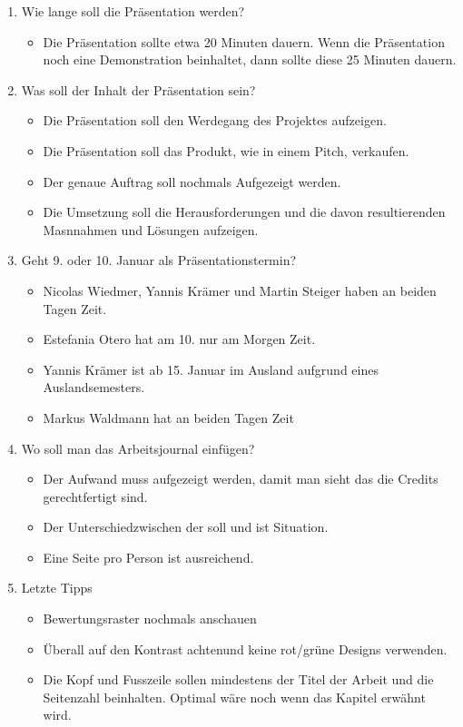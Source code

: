 \documentclass[a4paper, table]{article}
\begin{document}
\begin{enumerate}
    \item Wie lange soll die Präsentation werden?
        \begin{itemize}
            \item Die Präsentation sollte etwa 20 Minuten dauern. Wenn die Präsentation noch eine Demonstration beinhaltet, dann sollte diese 25 Minuten dauern.
        \end{itemize}
    \item Was soll der Inhalt der Präsentation sein?
        \begin{itemize}
            \item Die Präsentation soll den Werdegang des Projektes aufzeigen.
            \item Die Präsentation soll das Produkt, wie in einem Pitch, verkaufen.
            \item Der genaue Auftrag soll nochmals Aufgezeigt werden.
            \item Die Umsetzung soll die Herausforderungen und die davon resultierenden Masnnahmen und Lösungen aufzeigen.
        \end{itemize}
    \item Geht 9. oder 10. Januar als Präsentationstermin?
        \begin{itemize}
            \item Nicolas Wiedmer, Yannis Krämer und Martin Steiger haben an beiden Tagen Zeit.
            \item Estefania Otero hat am 10. nur am Morgen Zeit.
            \item Yannis Krämer ist ab 15. Januar im Ausland aufgrund eines Auslandsemesters.
            \item Markus Waldmann hat an beiden Tagen Zeit
        \end{itemize}
    \item Wo soll man das Arbeitsjournal einfügen?
        \begin{itemize}
            \item Der Aufwand muss aufgezeigt werden, damit man sieht das die Credits gerechtfertigt sind.
            \item Der Unterschiedzwischen der soll und ist Situation.
            \item Eine Seite pro Person ist ausreichend.
        \end{itemize}
    \item Letzte Tipps
        \begin{itemize}
            \item Bewertungsraster nochmals anschauen
            \item Überall auf den Kontrast achtenund keine rot/grüne Designs verwenden.
            \item Die Kopf und Fusszeile sollen mindestens der Titel der Arbeit und die Seitenzahl beinhalten. Optimal wäre noch wenn das Kapitel erwähnt wird.
        \end{itemize}
\end{enumerate}
\end{document}
